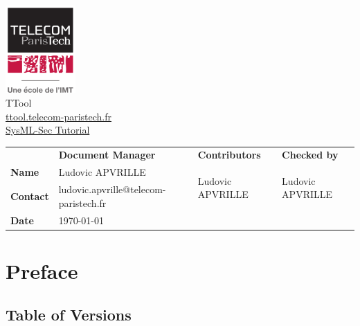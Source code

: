 \documentclass[12pt]{article}
\begin{document}
\sloppy 

\begin{center}

\includegraphics[width=0.2\textwidth]{figures/logotpt}
\vspace{10 pt}\\
\Huge TTool \\
\vspace{10 pt}
\Large \url{ttool.telecom-paristech.fr}
\vspace{20 pt}\\
\underline{\Large SysML-Sec Tutorial}
\vspace{30 pt}
\end{center}

\begin{table}[H]
\large
\centering
\begin{adjustbox}{width=\textwidth}
\begin{tabular}{ |p{1.6cm}|p{6.0cm}|p{4.2cm}|p{4.2cm}| }
\hhline{----}
 & \textbf{Document Manager} & \textbf{Contributors}  & \textbf{Checked by}  \\ 
\hhline{----}
\textbf{Name}   & Ludovic APVRILLE & \multirow{2}{*}{Ludovic APVRILLE} &
\multirow{2}{*}{Ludovic APVRILLE} \\
\hhline{--~~}
\textbf{Contact} & ludovic.apvrille@telecom-paristech.fr &  &  \\ 
\hhline{--~~}
\textbf{Date} & \today &  &  \\ 
\hline
\end{tabular}
\end{adjustbox}
\end{table}

\newpage
\tableofcontents


\newpage
\section{Preface}

\subsection{Table of Versions}
\end{document}
